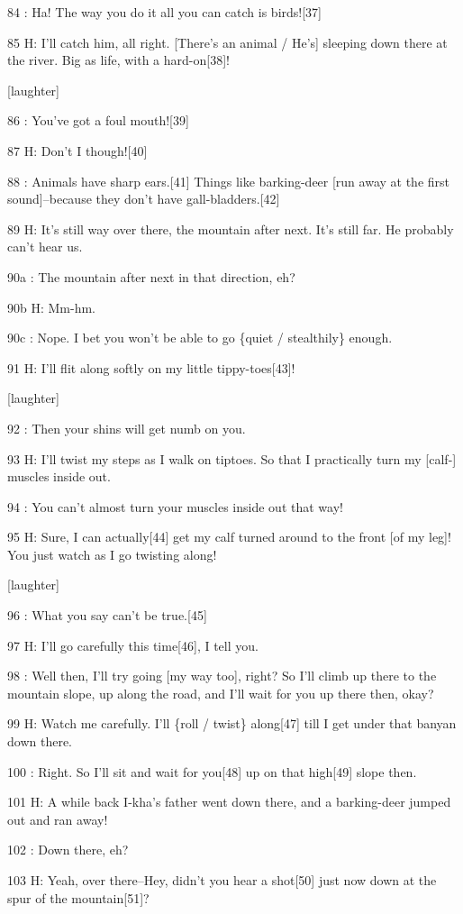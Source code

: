 84  : Ha! The way you do it all you can catch is birds![37]

85 H: I'll catch him, all right. [There's an animal / He's] sleeping down there
at the river. Big as life, with a hard-on[38]!

[laughter]

86  : You've got a foul mouth![39]

87 H: Don't I though![40]

88  : Animals have sharp ears.[41] Things like barking-deer [run away at the first
sound]--because they don't have gall-bladders.[42]

89 H: It's still way over there, the mountain after next. It's still far. He probably
can't hear us.

90a  : The mountain after next in that direction, eh?

90b H: Mm-hm.

90c  : Nope. I bet you won't be able to go \{quiet / stealthily\} enough.

91 H: I'll flit along softly on my little tippy-toes[43]!

[laughter]

92  : Then your shins will get numb on you.

93 H: I'll twist my steps as I walk on tiptoes. So that I practically turn my [calf-]
muscles inside out.

94  : You can't almost turn your muscles inside out that way!

95 H: Sure, I can actually[44] get my calf turned around to the front [of my leg]!
You just watch as I go twisting along!

[laughter]

96  : What you say can't be true.[45]

97 H: I'll go carefully this time[46], I tell you.

98  : Well then, I'll try going [my way too], right? So I'll climb up there to
the mountain slope, up along the road, and I'll wait for you up there then, okay?

99 H: Watch me carefully. I'll \{roll / twist\} along[47] till I get under that
banyan down there.

100  : Right. So I'll sit and wait for you[48] up on that high[49] slope then.

101 H: A while back I-kha's father went down there, and a barking-deer jumped out
and ran away!

102  : Down there, eh?

103 H: Yeah, over there--Hey, didn't you hear a shot[50] just now down at the spur
of the mountain[51]?

